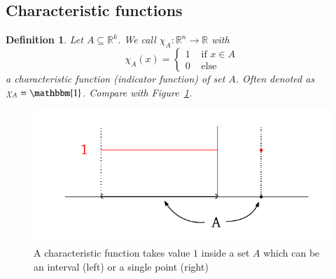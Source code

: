 \documentclass{article}
\newtheorem{definition}{Definition}  \numberwithin{definition}{section}
\begin{document}
\subsection{Characteristic functions}

\begin{definition} %
  Let $A \subseteq \mathbb R^k$. We call $\chi_A: \mathbb R^n \to \mathbb R$ with
  \[
    \chi_A(x) = \begin{cases}
      1 & \text{ if } x \in A \\
      0 & \text{ else}
    \end{cases}
  \]
  a \emph{characteristic function} (indicator function) of set $A$.
  Often denoted as $\chi_A = \mathbbm{1}$. Compare with Figure~\ref{img:charf}.
\end{definition}

\begin{figure}[t]
  \begin{center}
    \includegraphics{img/13_characteristic_function.pdf}
    \caption{A characteristic function takes value $1$ inside a set $A$ which can be an interval (left) or a single point (right)}
    \label{img:charf}
  \end{center}
\end{figure}
\end{document}
